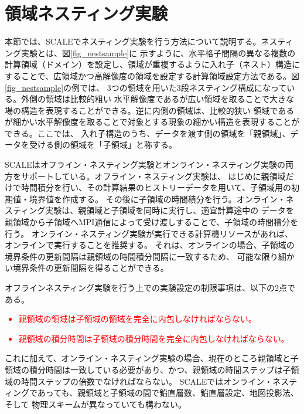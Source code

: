 \section{領域ネスティング実験} \label{sec:nest_exp}

本節では、SCALEでネスティング実験を行う方法について説明する。ネスティング実験とは、図\ref{fig_nestsample}に
示すように、水平格子間隔の異なる複数の計算領域（ドメイン）を設定し、領域が重複するように入れ子（ネスト）構造に
することで、広領域かつ高解像度の領域を設定する計算領域設定方法である。図\ref{fig_nestsample}の例では、
3つの領域を用いた3段ネスティング構成になっている。外側の領域は比較的粗い
水平解像度であるが広い領域を取ることで大きな場の構造を表現することができる。逆に内側の領域は、比較的狭い
領域であるが細かい水平解像度を取ることで対象とする現象の細かい構造を表現することができる。ここでは、
入れ子構造のうち、データを渡す側の領域を「親領域」、データを受ける側の領域を「子領域」と称する。

SCALEはオフライン・ネスティング実験とオンライン・ネスティング実験の両方をサポートしている。オフライン・ネスティング実験は、
はじめに親領域だけで時間積分を行い、その計算結果のヒストリーデータを用いて、子領域用の初期値・境界値を作成する。
その後に子領域の時間積分を行う。オンライン・ネスティング実験は、親領域と子領域を同時に実行し、適宜計算途中の
データを親領域から子領域へMPI通信によって受け渡しすることで、子領域の時間積分を行う。
オンライン・ネスティング実験が実行できる計算機リソースがあれば、オンラインで実行することを推奨する。
それは、オンラインの場合、子領域の境界条件の更新間隔は親領域の時間積分間隔に一致するため、
可能な限り細かい境界条件の更新間隔を得ることができる。


オフラインネスティング実験を行う上での実験設定の制限事項は、以下の2点である。
\textcolor{red}{
\begin{itemize}
 \item 親領域の領域は子領域の領域を完全に内包しなければならない。
 \item 親領域の積分時間は子領域の積分時間を完全に内包しなければならない。
\end{itemize}
}

これに加えて、オンライン・ネスティング実験の場合、現在のところ親領域と子領域の積分時間は一致している必要があり、かつ、親領域の時間ステップは子領域の時間ステップの倍数でなければならない。
SCALEではオンライン・ネスティングであっても、親領域と子領域の間で鉛直層数、鉛直層設定、地図投影法、そして
物理スキームが異なっていても構わない。

